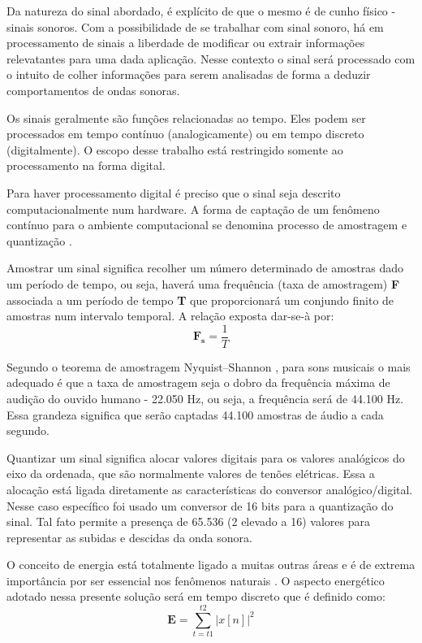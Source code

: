 Da natureza do sinal abordado, é explícito de que o mesmo é de cunho físico - sinais sonoros. Com a possibilidade de se trabalhar com sinal sonoro, há em processamento de sinais a liberdade de modificar ou extrair informações relevatantes para uma dada aplicação. Nesse contexto o sinal será processado com o intuito de colher informações para serem analisadas de forma a deduzir comportamentos de ondas sonoras.

Os sinais geralmente são funções relacionadas ao tempo. Eles podem ser processados em tempo contínuo (analogicamente) ou em tempo discreto (digitalmente). O escopo desse trabalho está restringido somente ao processamento na forma digital.

Para haver processamento digital é preciso que o sinal seja descrito computacionalmente num hardware. A forma de captação de um fenômeno contínuo para o ambiente computacional se denomina processo de amostragem e quantização \cite{amostragem}.

Amostrar um sinal significa recolher um número determinado de amostras dado um período de tempo, ou seja, haverá uma frequência (taxa de amostragem) \textbf{F} associada a um período de tempo \textbf{T} que proporcionará um conjundo finito de amostras num intervalo temporal. A relação exposta dar-se-à por:
\begin{equation}
\label{eqn05}
	\mathbf{F_s} = \frac{1}{T}
\end{equation}

Segundo o teorema de amostragem Nyquist–Shannon \cite{Nyquist}, para sons musicais o mais adequado é que a taxa de amostragem seja o dobro da frequência máxima de audição do ouvido humano - 22.050 Hz, ou seja, a frequência será de 44.100 Hz. Essa grandeza significa que serão captadas 44.100 amostras de áudio a cada segundo.

Quantizar um sinal significa alocar valores digitais para os valores analógicos do eixo da ordenada, que são normalmente valores de tenões elétricas. Essa a alocação está ligada diretamente as características do conversor analógico/digital. Nesse caso específico foi usado um conversor de 16 bits para a quantização do sinal. Tal fato permite a presença de 65.536 (2 elevado a 16) valores para representar as subidas e descidas da onda sonora.

O conceito de energia está totalmente ligado a muitas outras áreas e é de extrema importância por ser essencial nos fenômenos naturais \cite{oppenheim}. O aspecto energético adotado nessa presente solução será em tempo discreto que é definido como:
\begin{equation}
\label{eqn07}
	\mathbf{E} = \sum_{t=t1}^{t2}{|x[n]|^{2}}
\end{equation}

